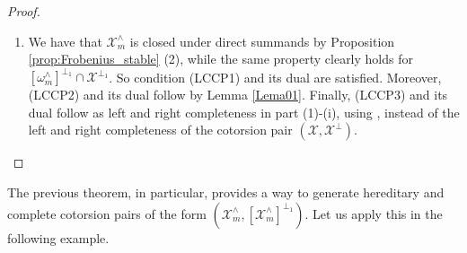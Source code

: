\documentclass[10pt,reqno]{amsart}
\numberwithin{equation}{section}
\theoremstyle{remark}
\newcommand{\C}{\mathfrak{C}}
\newcommand{\X}{\mathcal{X}}
\begin{document}
\begin{proof}
\begin{enumerate}[(1)]
\begin{itemize}
\item \underline{Right completeness}: Analogous to the previous point, using that $(\X,\X^\perp)$ is right complete. 
\end{itemize}     
Now suppose that $(\X^\wedge_m,[\X^\wedge_m]^\perp)$ is a hereditary and complete cotorsion pair in $\C$, and let $M \in \X^\perp$. Then, there is an exact sequence $M \rightarrowtail K \twoheadrightarrow L'$ with $K \in [\X^\wedge_m]^\perp \subseteq [\omega^\wedge_m]^{\perp_1}$ and $L' \in \X^\wedge_m$. Since $[\X^\wedge_m]^\perp \subseteq \X^\perp$ and $\X^\perp$ is closed under monocokernels, we have that $L' \in \X^\perp \cap \X^\wedge_m = \omega^\wedge_m$ by Lemma \ref{LemaGorro} (2). The existence of an exact sequence $K' \rightarrowtail L \twoheadrightarrow M$ with $L \in \omega^\wedge_m$ and $K' \in [\omega^\wedge_m]^{\perp_1}$ follows similarly. 

\item We have that $\X^\wedge_m$ is closed under direct summands by Proposition \ref{prop:Frobenius_stable} (2), while the same property clearly holds for $[\omega^{\wedge}_m]^{\perp_1} \cap \X^{\perp_1}$. So condition {\sf (LCCP1)} and its dual are satisfied. Moreover, {\sf (LCCP2)} and its dual follow by Lemma \ref{Lema01}. Finally, {\sf (LCCP3)} and its dual follow as left and right completeness in part (1)-(i), using \cite[Thm. 2.8]{BMSP}, instead of the left and right completeness of the cotorsion pair $(\X,\X^\perp)$. 
\end{enumerate}
\end{proof}


The previous theorem, in particular, provides a way to generate hereditary and complete cotorsion pairs of the form $(\X^\wedge_m,[\X^\wedge_m]^{\perp_1})$. Let us apply this in the following example. \\
\end{document}
